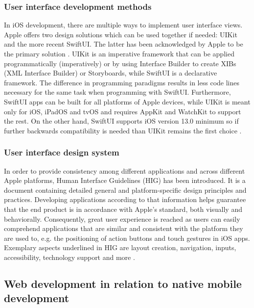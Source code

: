 \subsubsection*{User interface development methods}

In iOS development, there are multiple ways to implement user interface views. Apple offers two design solutions which can be used together if needed: UIKit and the more recent SwiftUI. The latter has been acknowledged by Apple to be the primary solution \cite{comparison_technologies_multiplatform}. UIKit is an imperative framework that can be applied programmatically (imperatively) or by using Interface Builder to create XIBs (XML Interface Builder) or Storyboards, while SwiftUI is a declarative framework. The difference in programming paradigms results in less code lines necessary for the same task when programming with SwiftUI. Furthermore, SwiftUI apps can be built for all platforms of Apple devices, while UIKit is meant only for iOS, iPadOS and tvOS and requires AppKit and WatchKit to support the rest. On the other hand, SwiftUI supports iOS version 13.0 minimum so if further backwards compatibility is needed than UIKit remains the first choice \cite{swiftui_overview,xib_why_use,swiftui_uikit}.

\subsubsection*{User interface design system}

In order to provide consistency among different applications and across different Apple platforms, Human Interface Guidelines (HIG) has been introduced. It is a document containing detailed general and platform-specific design principles and practices. Developing applications according to that information helps guarantee that the end product is in accordance with Apple's standard, both visually and behaviorally. Consequently, great user experience is reached as users can easily comprehend applications that are similar and consistent with the platform they are used to, e.g. the positioning of action buttons and touch gestures in iOS apps. Exemplary aspects underlined in HIG are layout creation, navigation, inputs, accessibility, technology support and more \cite{hig_overview}.

\subsection{Web development in relation to native mobile development}

